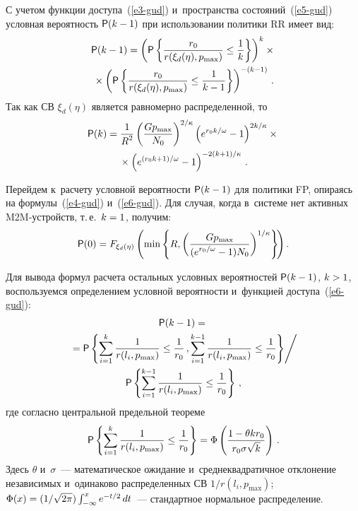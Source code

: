 \begin{multicols}{2}
  С учетом функции доступа~(\ref{e3-gud}) и~пространства состояний~(\ref{e5-gud}) условная вероятность ${\sf P}(k-1)$ при использовании политики RR 
имеет вид:
\begin{multline*}
  {\sf P}(k-1)= \left( {\sf P}\left\{ \displaystyle\frac{\displaystyle r_0\mathstrut}{\displaystyle r(\xi_d(\eta),p_{\max})\mathstrut}\leq 
\displaystyle\frac{\displaystyle 1\mathstrut}{\displaystyle k\mathstrut}\right\}\right)^k\times{}\\
 {}\times\left( {\sf P}\left\{ 
\displaystyle\frac{\displaystyle r_0\mathstrut}{\displaystyle r(\xi_d(\eta),p_{\max})\mathstrut}\leq \displaystyle\frac{\displaystyle 1\mathstrut}{\displaystyle k-1\mathstrut}\right\}\right)^{-(k-1)}\,.
  \end{multline*}
  Так как СВ $\xi_d(\eta)$ является равномерно распределенной, то
  \begin{multline*}
  {\sf P}(k)=\displaystyle\frac{\displaystyle 1\mathstrut}{\displaystyle R^2\mathstrut}\left(\displaystyle\frac{\displaystyle Gp_{\max}\mathstrut}{\displaystyle N_0\mathstrut}\right)^{2/\kappa} \left( 
e^{r_0k/\omega}-1\right)^{2k/\kappa}\times{} \\
{}\times
\left( e^{(r_0k+1)/\omega}-1\right) ^{-
2(k+1)/\kappa}\,.
  \end{multline*}
  
  Перейдем к~расчету условной вероятности ${\sf P}(k\hm-1)$ для политики FP, 
опираясь на формулы~(\ref{e4-gud}) и~(\ref{e6-gud}). Для случая, когда 
в~системе нет активных M2M-устройств, т.\,е.\ $k\hm=1$, получим: 
  \begin{equation*}
  {\sf P}(0)=F_{\xi_d(\eta)}\left( \min \left\{ R,\left( 
\displaystyle\frac{\displaystyle Gp_{\max}\mathstrut}{\displaystyle (e^{r_0/\omega}-1)N_0\mathstrut}\right)^{1/\kappa}\right\}\!\right).
  \end{equation*}
  
  Для вывода формул расчета остальных условных вероятностей ${\sf P}(k-1)$, 
$k\hm>1$, воспользуемся определением условной вероятности и~функцией 
доступа~(\ref{e6-gud}):
  \begin{multline*}
  {\sf P}(k-1)={}\\
  {}={\sf P}\left\{ \sum\limits^k_{i=1} \displaystyle\frac{\displaystyle 1\mathstrut}{\displaystyle r(l_i,p_{\max})\mathstrut}\leq 
\displaystyle\frac{\displaystyle 1\mathstrut}{\displaystyle r_0\mathstrut}\,, \sum_{i=1}^{k-1}\displaystyle\frac{\displaystyle 1\mathstrut}{\displaystyle r(l_i,p_{\max})\mathstrut}\leq \displaystyle\frac{\displaystyle 1\mathstrut}{\displaystyle r_0\mathstrut}\right\} 
\!\Bigg /\\
{} {\sf P} \left\{ \sum\limits_{i=1}^{k-1} \displaystyle\frac{\displaystyle 1\mathstrut}{\displaystyle r(l_i,p_{\max})\mathstrut}\leq 
\displaystyle\frac{\displaystyle 1\mathstrut}{\displaystyle r_0\mathstrut}\right\}\,,
  \end{multline*}
где согласно центральной предельной теореме
$$
{\sf P}\left\{ \sum\limits^k_{i=1} \displaystyle\frac{\displaystyle 1\mathstrut}{\displaystyle r(l_i,p_{\max})\mathstrut}\leq 
\displaystyle\frac{\displaystyle 1\mathstrut}{\displaystyle r_0\mathstrut}\right\}=\Phi\left(\displaystyle\frac{\displaystyle  1-\theta k r_0\mathstrut}{\displaystyle r_0\sigma \sqrt{k}\mathstrut}\right)\,.
$$
Здесь  $\theta$ и~$\sigma$~--- математическое ожидание и~среднеквадратичное 
отклонение независимых и~одинаково распределенных СВ $1/r(l_i,p_{\max})$; 
$\Phi(x)\hm= (1/\sqrt{2\pi}) \int\nolimits^x_{-\infty} e^{-t/2}\,dt$~--- стандартное 
нормальное распределение.   
  

\end{multicols}
